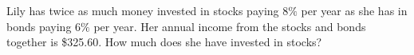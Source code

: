 Lily has twice as much money invested in stocks paying $8\%$ per year as she has in bonds paying $6\%$ per year. Her annual income from the stocks and bonds together is \$325.60. How much does she have invested in stocks?
